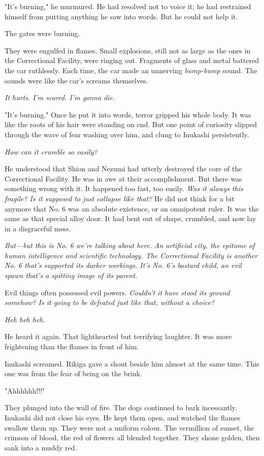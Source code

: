 "It's burning," he murmured. He had resolved not to voice it; he had
restrained himself from putting anything he saw into words. But he could
not help it.

The gates were burning.

They were engulfed in flames. Small explosions, still not as large as
the ones in the Correctional Facility, were ringing out. Fragments of
glass and metal battered the car ruthlessly. Each time, the car made an
unnerving \emph{bump-bump} sound. The sounds were like the car's screams
themselves.

\emph{It hurts. I'm scared. I'm gonna die.}

"It's burning." Once he put it into words, terror gripped his whole
body. It was like the roots of his hair were standing on end. But one
point of curiosity slipped through the wave of fear washing over him,
and clung to Inukashi persistently.

\emph{How can it crumble so easily?}

He understood that Shion and Nezumi had utterly destroyed the core of
the Correctional Facility. He was in awe at their accomplishment. But
there was something wrong with it. It happened too fast, too easily. \emph{Was
it always this fragile? Is it supposed to just collapse like that?} He
did not think for a bit anymore that No. 6 was an absolute existence, or
an omnipotent ruler. It was the same as that special alloy door. It had
bent out of shape, crumbled, and now lay in a disgraceful mess.

\emph{But---but this is No. 6 we're talking about here. An artificial city, the
epitome of human intelligence and scientific technology. The
Correctional Facility is another No. 6 that's supported its darker
workings. It's No. 6's bastard child, an evil spawn that's a spitting
image of its parent.}

Evil things often possessed evil powers. \emph{Couldn't it have stood its
ground somehow? Is it going to be defeated just like that, without a
choice?}

\emph{Heh heh heh.}

He heard it again. That lighthearted but terrifying laughter. It was
more frightening than the flames in front of him.

Inukashi screamed. Rikiga gave a shout beside him almost at the same
time. This one was from the fear of being on the brink.

"Ahhhhhh!!!"

They plunged into the wall of fire. The dogs continued to bark
incessantly. Inukashi did not close his eyes. He kept them open, and
watched the flames swallow them up. They were not a uniform colour. The
vermillion of sunset, the crimson of blood, the red of flowers all
blended together. They shone golden, then sank into a muddy red.


